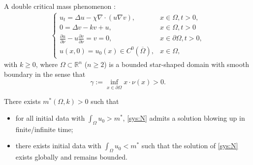 
%

\begin{frame}{A double critical mass phenomenon}
 :
\begin{align*}
\begin{cases}\label{sys:N}\tag{N}
u_t=\Delta u-\chi\nabla \cdot\left( u \nabla v\right), &x\in\Omega, t>0,\\
0= \Delta v- kv+u,&x\in\Omega, t>0\\
\frac{\partial u}{\partial \nu}-u\frac{\partial v}{\partial \nu}=v=0, & x \in \partial \Omega, t>0, \\ u(x, 0)=u_0(x)\in C^0(\overline{\Omega}), & x \in \Omega,
\end{cases}
\end{align*}
with $k\geqslant0$, where $\Omega \subset \mathbb{R}^n$ ($n\geqslant2$) is a bounded star-shaped domain with smooth boundary in the sense that
$$
\gamma:=\inf _{x \in \partial \Omega} x \cdot \nu(x)>0 .
$$

There exists $m^\ast(\Omega,k)>0$ such that
\begin{itemize}
    \item  for \alert{all} initial data with $\int_\Omega u_0 > m^\ast$, \eqref{sys:N} admits a solution blowing up in finite/infinite time;
    \item  there exists initial data with $\int_{\Omega} u_0 < m^\ast$ such that the solution of \eqref{sys:N} exists globally and remains bounded.
\end{itemize}
\end{frame}

